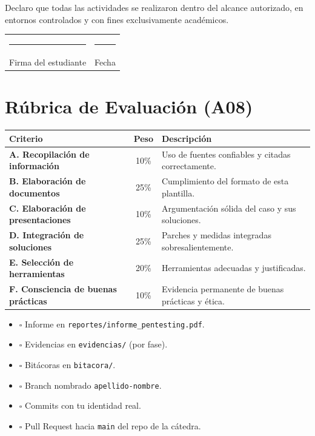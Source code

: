 \documentclass[11pt,a4paper]{article}
\begin{document}
\begin{campo}
Declaro que todas las actividades se realizaron dentro del alcance autorizado, en entornos controlados y con fines exclusivamente académicos.\\[0.4cm]
\begin{tabularx}{\textwidth}{@{} X X @{}}
\rule{6cm}{0.4pt} & \rule{6cm}{0.4pt} \\
Firma del estudiante & Fecha \\
\end{tabularx}
\end{campo}

\section{Rúbrica de Evaluación (A08)}

\begin{center}
\renewcommand{\arraystretch}{1.3}
\begin{tabularx}{\textwidth}{@{} l c X @{}}
\toprule
\textbf{Criterio} & \textbf{Peso} & \textbf{Descripción} \\
\midrule
\textbf{A. Recopilación de información} & 10\% & Uso de fuentes confiables y citadas correctamente. \\
\textbf{B. Elaboración de documentos} & 25\% & Cumplimiento del formato de esta plantilla. \\
\textbf{C. Elaboración de presentaciones} & 10\% & Argumentación sólida del caso y sus soluciones. \\
\textbf{D. Integración de soluciones} & 25\% & Parches y medidas integradas sobresalientemente. \\
\textbf{E. Selección de herramientas} & 20\% & Herramientas adecuadas y justificadas. \\
\textbf{F. Consciencia de buenas prácticas} & 10\% & Evidencia permanente de buenas prácticas y ética. \\
\bottomrule
\end{tabularx}
\end{center}

\begin{tip}
\begin{itemize}[leftmargin=*]
  \item $\square$ Informe en \texttt{reportes/informe\_pentesting.pdf}.
  \item $\square$ Evidencias en \texttt{evidencias/} (por fase).
  \item $\square$ Bitácoras en \texttt{bitacora/}.
  \item $\square$ Branch nombrado \texttt{apellido-nombre}.
  \item $\square$ Commits con tu identidad real.
  \item $\square$ Pull Request hacia \texttt{main} del repo de la cátedra.
\end{itemize}
\end{tip}
\end{document}
